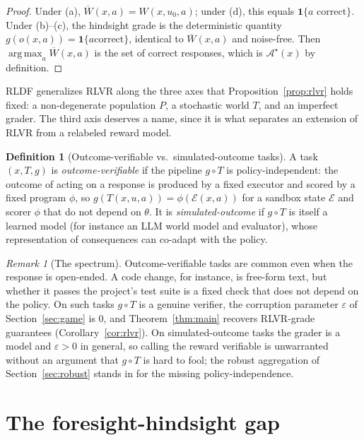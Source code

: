 \documentclass[11pt]{article}
\theoremstyle{plain}
\theoremstyle{definition}
\newtheorem{definition}{Definition}
\theoremstyle{remark}
\newtheorem{remark}{Remark}
\newcommand{\Ind}{\mathbf{1}}
\newcommand{\Ac}{\mathcal{A}}
\newcommand{\Ec}{\mathcal{E}}
\newcommand{\Wbar}{\overline{W}}
\newcommand{\eps}{\varepsilon}
\DeclareMathOperator*{\argmax}{arg\,max}
\begin{document}
\begin{proof}
Under (a), $\Wbar(x,a)=W(x,u_0,a)$; under (d), this equals $\Ind\{a\text{ correct}\}$. Under
(b)--(c), the hindsight grade is the deterministic quantity $g(o(x,a))=\Ind\{a\text{
correct}\}$, identical to $\Wbar(x,a)$ and noise-free. Then $\argmax_a\Wbar(x,a)$ is the set
of correct responses, which is $\Ac^\star(x)$ by definition.
\end{proof}

RLDF generalizes RLVR along the three axes that Proposition~\ref{prop:rlvr} holds fixed: a
non-degenerate population $P$, a stochastic world $T$, and an imperfect grader. The third axis
deserves a name, since it is what separates an extension of RLVR from a relabeled reward model.

\begin{definition}[Outcome-verifiable vs.\ simulated-outcome tasks]
\label{def:vo}
A task $(x,T,g)$ is \emph{outcome-verifiable} if the pipeline $g\circ T$ is policy-independent:
the outcome of acting on a response is produced by a fixed executor and scored by a fixed
program $\phi$, so $g(T(x,u,a))=\phi(\Ec(x,a))$ for a sandbox state $\Ec$ and scorer $\phi$ that
do not depend on $\theta$. It is \emph{simulated-outcome} if $g\circ T$ is itself a learned model
(for instance an LLM world model and evaluator), whose representation of consequences can
co-adapt with the policy.
\end{definition}

\begin{remark}[The spectrum]
\label{rem:spectrum}
Outcome-verifiable tasks are common even when the response is open-ended. A code change, for
instance, is free-form text, but whether it passes the project's test suite is a fixed check
that does not depend on the policy. On such tasks $g\circ T$ is a genuine verifier, the
corruption parameter $\eps$ of Section~\ref{sec:game} is $0$, and Theorem~\ref{thm:main} recovers
RLVR-grade guarantees (Corollary~\ref{cor:rlvr}). On simulated-outcome tasks the grader is a
model and $\eps>0$ in general, so calling the reward verifiable is unwarranted without an
argument that $g\circ T$ is hard to fool; the robust aggregation of Section~\ref{sec:robust}
stands in for the missing policy-independence.
\end{remark}


\section{The foresight-hindsight gap}
\label{sec:foresight}
\end{document}
